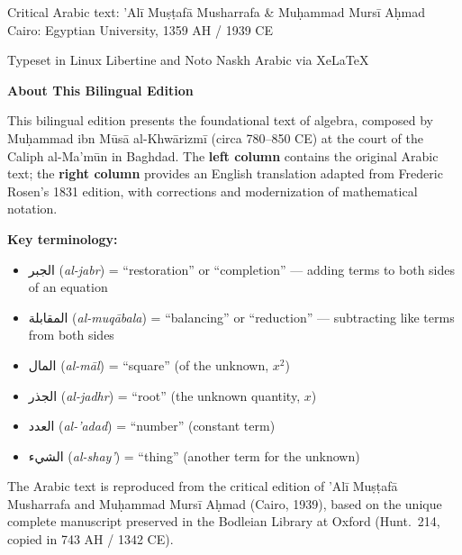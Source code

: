 \documentclass[11pt,a4paper,openany,oneside]{book}
\newcommand{\ar}[1]{{\arabicfont\beginR #1\endR}}
\begin{document}
\begin{titlepage}
\begin{center}
\vspace{0.8cm}

{\small Critical Arabic text: 'Al\={i} Mu\d{s}\d{t}af\=a Musharrafa \& Mu\d{h}ammad Murs\={i} A\d{h}mad}\\[0.1cm]
{\small Cairo: Egyptian University, 1359 AH / 1939 CE}

\vfill

{\footnotesize Typeset in Linux Libertine and Noto Naskh Arabic via XeLaTeX}

\end{center}
\end{titlepage}

\thispagestyle{empty}
\begin{center}
\vspace*{2cm}

{\Large\textbf{About This Bilingual Edition}}

\vspace{0.8cm}

\begin{minipage}{0.85\textwidth}
\small
This bilingual edition presents the foundational text of algebra, composed by
Mu\d{h}ammad ibn M\=us\=a al-Khw\=arizm\={i} (circa 780--850 CE) at the court
of the Caliph al-Ma'm\=un in Baghdad. The \textbf{left column} contains the
original Arabic text; the \textbf{right column} provides an English translation
adapted from Frederic Rosen's 1831 edition, with corrections and modernization
of mathematical notation.

\vspace{0.4cm}

\textbf{Key terminology:}
\begin{itemize}[leftmargin=1.5em,topsep=2pt]
  \item \ar{الجبر} (\textit{al-jabr}) = ``restoration'' or ``completion'' — adding terms to both sides of an equation
  \item \ar{المقابلة} (\textit{al-muq\=abala}) = ``balancing'' or ``reduction'' — subtracting like terms from both sides
  \item \ar{المال} (\textit{al-m\=al}) = ``square'' (of the unknown, $x^2$)
  \item \ar{الجذر} (\textit{al-jadhr}) = ``root'' (the unknown quantity, $x$)
  \item \ar{العدد} (\textit{al-'adad}) = ``number'' (constant term)
  \item \ar{الشيء} (\textit{al-shay'}) = ``thing'' (another term for the unknown)
\end{itemize}

\vspace{0.4cm}

The Arabic text is reproduced from the critical edition of 'Al\={i} Mu\d{s}\d{t}af\=a
Musharrafa and Mu\d{h}ammad Murs\={i} A\d{h}mad (Cairo, 1939), based on the
unique complete manuscript preserved in the Bodleian Library at Oxford
(Hunt.~214, copied in 743 AH / 1342 CE).
\end{minipage}
\end{center}
\end{document}
